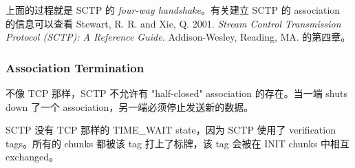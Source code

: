       上面的过程就是 SCTP 的 \textit{four-way handshake}。有关建立 SCTP 的 association 的信息可以查看 Stewart, R. R. and Xie, Q. 2001. \textit{Stream Control Transmission Protocol (SCTP): A Reference Guide.} Addison-Wesley, Reading, MA. 的第四章。

    \subsubsection{Association Termination}

      不像 TCP 那样，SCTP 不允许有 "half-closed" association 的存在。当一端 shuts down 了一个 association，另一端必须停止发送新的数据。

      SCTP 没有 TCP 那样的 TIME\_WAIT state，因为 SCTP 使用了 verification tags。所有的 chunks 都被该 tag 打上了标牌，该 tag 会被在 INIT chunks 中相互 exchanged。
